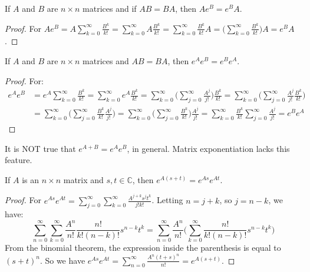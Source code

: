 \documentclass[crop=false,class=book,oneside]{standalone}
\begin{document}
        \begin{theorem}
        If $A$ and $B$ are $n\times n$ matrices and if $AB = BA$, then $Ae^{B} = e^{B} A$.
        \end{theorem}
        \begin{proof}
        For $Ae^{B} = A\sum_{k=0}^{\infty} \frac{B^{k}}{k!} = \sum_{k=0}^{\infty} A\frac{B^{k}}{k!} = \sum_{k=0}^{\infty} \frac{B^{k}}{k!}A = \big(\sum_{k=0}^{\infty} \frac{B^{k}}{k!}\big)A = e^{B}A$.
        \end{proof}
        \begin{theorem}
        If $A$ and $B$ are $n\times n$ matrices and $AB = BA$, then $e^{A}e^{B} = e^{B}e^{A}$.
        \end{theorem}
        \begin{proof}
        For:
        \begin{align*}
            e^A e^B &= e^A\sum_{k=0}^{\infty}\frac{B^k}{k!}=\sum_{k=0}^{\infty} e^A\frac{B^k}{k!}= \sum_{k=0}^{\infty} \big(\sum_{j=0}^{\infty} \frac{A^j}{j!}\big) \frac{B^k}{k!}= \sum_{k=0}^{\infty}\big(\sum_{j=0}^{\infty} \frac{A^j}{j!}\frac{B^k}{k!}\big)\\
            &=\sum_{k=0}^{\infty}\big(\sum_{j=0}^{\infty} \frac{B^k}{k!}\frac{A^j}{j!}\big)=\sum_{k=0}^{\infty}\big(\sum_{j=0}^{\infty} \frac{B^k}{k!}\big)\frac{A^j}{j!}= \sum_{k=0}^{\infty}\frac{B^k}{k!}\sum_{j=0}^{\infty}\frac{A^j}{j!}=e^{B}e^{A}
        \end{align*}
        \end{proof}
        It is NOT true that $e^{A+B}=e^{A}e^{B}$, in general. Matrix exponentiation lacks this feature.
        \begin{theorem}
        If $A$ is an $n\times n$ matrix and $s,t\in \mathbb{C}$, then $e^{A(s+t)} = e^{As}e^{At}$.
        \end{theorem}
        \begin{proof}
        For $e^{As}e^{At} = \sum_{j=0}^{\infty} \sum_{k=0}^{\infty} \frac{A^{j+k}s^jt^k}{j!k!}$. Letting $n = j+k$, so $j = n-k$, we have:
        \begin{equation*}
            \sum_{n=0}^{\infty} \sum_{k=0}^{\infty} \frac{A^n}{n!}\frac{n!}{k!(n-k)!}s^{n-k}t^k = \sum_{n=0}^{\infty}\frac{A^n}{n!}\big(\sum_{k=0}^{\infty} \frac{n!}{k!(n-k)!}s^{n-k}t^k\big)    
        \end{equation*}
        From the binomial theorem, the expression inside the parenthesis is equal to $(s+t)^n$. So we have $e^{As}e^{At}=\sum_{n=0}^{\infty} \frac{A^n(t+s)^n}{n!} = e^{A(s+t)}$.
        \end{proof}
\end{document}
